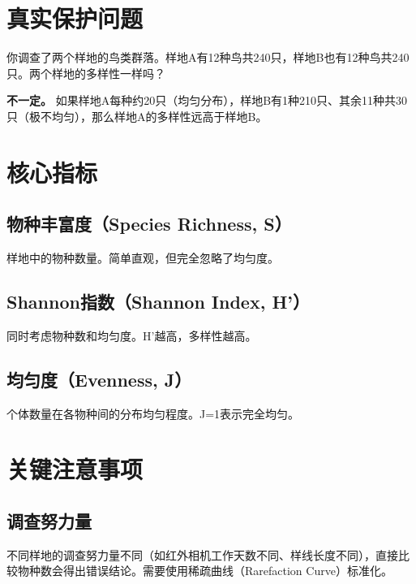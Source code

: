 \documentclass[
  letterpaper,
]{scrbook}
\begin{document}
\section{真实保护问题}\label{ux771fux5b9eux4fddux62a4ux95eeux9898-11}

你调查了两个样地的鸟类群落。样地A有12种鸟共240只，样地B也有12种鸟共240只。两个样地的多样性一样吗？

\textbf{不一定。}
如果样地A每种约20只（均匀分布），样地B有1种210只、其余11种共30只（极不均匀），那么样地A的多样性远高于样地B。

\section{核心指标}\label{ux6838ux5fc3ux6307ux6807}

\subsection{物种丰富度（Species Richness,
S）}\label{ux7269ux79cdux4e30ux5bccux5ea6species-richness-s}

样地中的物种数量。简单直观，但完全忽略了均匀度。

\subsection{Shannon指数（Shannon Index,
H'）}\label{shannonux6307ux6570shannon-index-h}

同时考虑物种数和均匀度。H'越高，多样性越高。

\subsection{均匀度（Evenness, J）}\label{ux5747ux5300ux5ea6evenness-j}

个体数量在各物种间的分布均匀程度。J=1表示完全均匀。

\section{关键注意事项}\label{ux5173ux952eux6ce8ux610fux4e8bux9879}

\subsection{调查努力量}\label{ux8c03ux67e5ux52aaux529bux91cf}

不同样地的调查努力量不同（如红外相机工作天数不同、样线长度不同），直接比较物种数会得出错误结论。需要使用稀疏曲线（Rarefaction
Curve）标准化。
\end{document}
